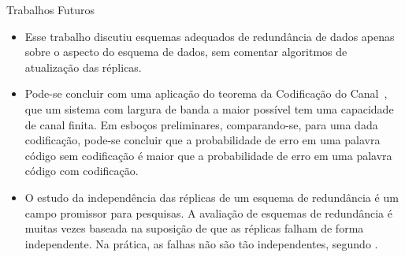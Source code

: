 \begin{frame}{Trabalhos Futuros}

   \begin{itemize}

      \item<1-> Esse trabalho discutiu esquemas adequados de redundância de dados apenas sobre o aspecto do esquema de dados, sem comentar algoritmos de atualização das réplicas.

      \item<2-> Pode-se concluir com uma aplicação do teorema da Codificação do Canal~\cite{Abrantes:2010,Schwartz:1990}, que um sistema com largura de banda a maior possível tem uma capacidade de canal finita. Em esboços preliminares, comparando-se, para uma dada codificação, pode-se concluir que a probabilidade de erro em uma palavra código sem codificação é maior que a probabilidade de erro em uma palavra código com codificação.

       \item<3-> O estudo da independência das réplicas de um esquema de redundância é um campo promissor para pesquisas. A avaliação de esquemas de redundância é muitas vezes baseada na suposição de que as réplicas falham de forma independente. Na prática, as falhas não são tão independentes, segundo \cite{Baker:2006,Weatherspoon:2002:02}.


  \end{itemize}

\end{frame}

